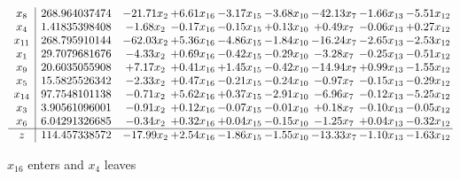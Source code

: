 \documentclass[9pt]{article}
\begin{document}
 \[\begin{array}{c| c c@{\hskip 2pt} c@{\hskip 2pt} c@{\hskip 2pt} c@{\hskip 2pt} c@{\hskip 2pt} c@{\hskip 2pt} c@{\hskip 2pt} }
 x_{8}   &  268.964037474 & -21.71 x_{2} & +  6.61 x_{16} & -3.17 x_{15} & -3.68 x_{10} & -42.13 x_{7} & -1.66 x_{13} & -5.51 x_{12}\\
 x_{4}   &  1.41835398408 & -1.68 x_{2} & -0.17 x_{16} & -0.15 x_{15} & +  0.13 x_{10} & +  0.49 x_{7} & -0.06 x_{13} & +  0.27 x_{12}\\
 x_{11}   &  268.795910144 & -62.03 x_{2} & +  5.36 x_{16} & -4.86 x_{15} & -1.84 x_{10} & -16.24 x_{7} & -2.65 x_{13} & -2.53 x_{12}\\
 x_{1}   &  29.7079681676 & -4.33 x_{2} & +  0.69 x_{16} & -0.42 x_{15} & -0.29 x_{10} & -3.28 x_{7} & -0.25 x_{13} & -0.51 x_{12}\\
 x_{9}   &  20.6035055908 & +  7.17 x_{2} & +  0.41 x_{16} & +  1.45 x_{15} & -0.42 x_{10} & -14.94 x_{7} & +  0.99 x_{13} & -1.55 x_{12}\\
 x_{5}   &  15.5825526342 & -2.33 x_{2} & +  0.47 x_{16} & -0.21 x_{15} & -0.24 x_{10} & -0.97 x_{7} & -0.15 x_{13} & -0.29 x_{12}\\
 x_{14}   &  97.7548101138 & -0.71 x_{2} & +  5.62 x_{16} & +  0.37 x_{15} & -2.91 x_{10} & -6.96 x_{7} & -0.12 x_{13} & -5.25 x_{12}\\
 x_{3}   &  3.90561096001 & -0.91 x_{2} & +  0.12 x_{16} & -0.07 x_{15} & -0.01 x_{10} & +  0.18 x_{7} & -0.10 x_{13} & -0.05 x_{12}\\
 x_{6}   &  6.04291326685 & -0.34 x_{2} & +  0.32 x_{16} & +  0.04 x_{15} & -0.15 x_{10} & -1.25 x_{7} & +  0.04 x_{13} & -0.32 x_{12}\\
\hline
z    &  114.457338572 & -17.99 x_{2} & +  2.54 x_{16} & -1.86 x_{15} & -1.55 x_{10} & -13.33 x_{7} & -1.10 x_{13} & -1.63 x_{12}\\
\end{array}\]


 $ x_{16} $ enters and $ x_{4} $ leaves 
\end{document}
